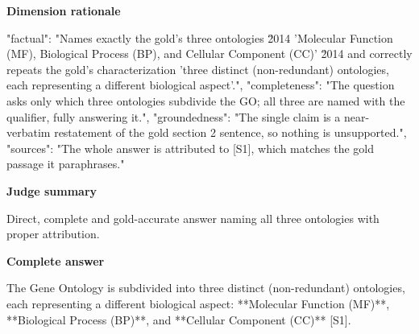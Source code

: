 \documentclass[10pt]{article}
\begin{document}
\textbf{Dimension rationale}
\begin{EvidenceText}
{
  "factual": "Names exactly the gold's three ontologies \u2014 'Molecular Function (MF), Biological Process (BP), and Cellular Component (CC)' \u2014 and correctly repeats the gold's characterization 'three distinct (non-redundant) ontologies, each representing a different biological aspect'.",
  "completeness": "The question asks only which three ontologies subdivide the GO; all three are named with the qualifier, fully answering it.",
  "groundedness": "The single claim is a near-verbatim restatement of the gold section 2 sentence, so nothing is unsupported.",
  "sources": "The whole answer is attributed to [S1], which matches the gold passage it paraphrases."
}
\end{EvidenceText}

\textbf{Judge summary}
\begin{EvidenceText}
Direct, complete and gold-accurate answer naming all three ontologies with proper attribution.
\end{EvidenceText}

\textbf{Complete answer}
\begin{AnswerText}
The Gene Ontology is subdivided into three distinct (non-redundant) ontologies, each representing a different biological aspect: **Molecular Function (MF)**, **Biological Process (BP)**, and **Cellular Component (CC)** [S1].
\end{AnswerText}
\end{document}
